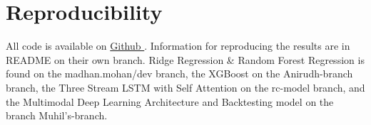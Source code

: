 \documentclass{article} %
\begin{document}
\section{Reproducibility}

All code is available on \href{https://github.com/greenden007/CropFuturesPrediction}{Github \faGithub}. Information for reproducing the results are in README on their own branch. Ridge Regression \& Random Forest Regression is found on the madhan.mohan/dev branch, the XGBoost on the Anirudh-branch branch, the Three Stream LSTM with Self Attention on the rc-model branch, and the Multimodal Deep Learning Architecture and Backtesting model on the branch Muhil's-branch.



\end{document}
